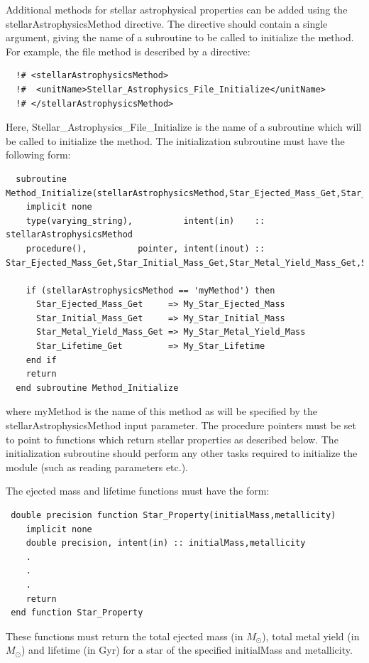 Additional methods for stellar astrophysical properties can be added using the {\normalfont \ttfamily stellarAstrophysicsMethod} directive. The directive should contain a single argument, giving the name of a subroutine to be called to initialize the method. For example, the {\normalfont \ttfamily file} method is described by a directive:
\begin{verbatim}
  !# <stellarAstrophysicsMethod>
  !#  <unitName>Stellar_Astrophysics_File_Initialize</unitName>
  !# </stellarAstrophysicsMethod>
\end{verbatim}
Here, {\normalfont \ttfamily Stellar\_Astrophysics\_File\_Initialize} is the name of a subroutine which will be called to initialize the method. The initialization subroutine must have the following form:
\begin{verbatim}
  subroutine Method_Initialize(stellarAstrophysicsMethod,Star_Ejected_Mass_Get,Star_Initial_Mass_Get,Star_Metal_Yield_Mass_Get,Star_Lifetime_Get)
    implicit none
    type(varying_string),          intent(in)    :: stellarAstrophysicsMethod
    procedure(),          pointer, intent(inout) :: Star_Ejected_Mass_Get,Star_Initial_Mass_Get,Star_Metal_Yield_Mass_Get,Star_Lifetime_Get
    
    if (stellarAstrophysicsMethod == 'myMethod') then
      Star_Ejected_Mass_Get     => My_Star_Ejected_Mass
      Star_Initial_Mass_Get     => My_Star_Initial_Mass
      Star_Metal_Yield_Mass_Get => My_Star_Metal_Yield_Mass
      Star_Lifetime_Get         => My_Star_Lifetime
    end if
    return
  end subroutine Method_Initialize
\end{verbatim}
where {\normalfont \ttfamily myMethod} is the name of this method as will be specified by the {\normalfont \ttfamily stellarAstrophysicsMethod} input parameter. The procedure pointers must be set to point to functions which return stellar properties as described below. The initialization subroutine should perform any other tasks required to initialize the module (such as reading parameters etc.).

The ejected mass and lifetime functions must have the form:
\begin{verbatim}
 double precision function Star_Property(initialMass,metallicity)
    implicit none
    double precision, intent(in) :: initialMass,metallicity
    .
    .
    .
    return
 end function Star_Property
\end{verbatim}
These functions must return the total ejected mass (in $M_\odot$), total metal yield (in $M_\odot$) and lifetime (in Gyr) for a star of the specified {\normalfont \ttfamily initialMass} and {\normalfont \ttfamily metallicity}.

